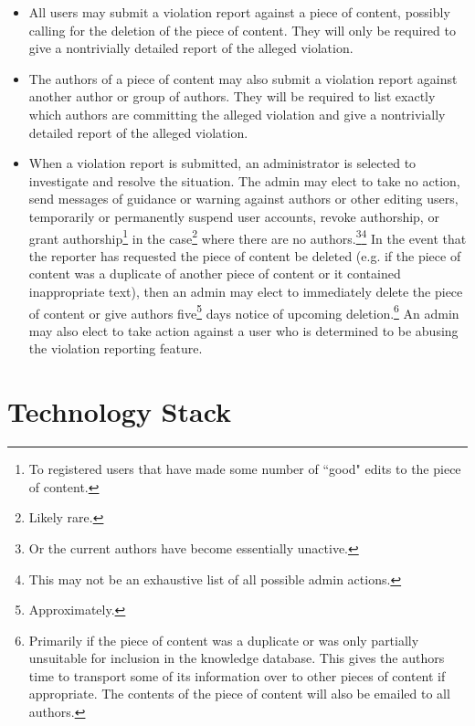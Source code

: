 \documentclass[12pt,letterpaper]{article}
\begin{document}
\begin{enumerate}
\begin{itemize}
\item All users may submit a violation report against a piece of content, possibly calling for the deletion of the piece of content. They will only be required to give a nontrivially detailed report of the alleged violation.
\item The authors of a piece of content may also submit a violation report against another author or group of authors. They will be required to list exactly which authors are committing the alleged violation and give a nontrivially detailed report of the alleged violation.
\item When a violation report is submitted, an administrator is selected to investigate and resolve the situation. The admin may elect to take no action, send messages of guidance or warning against authors or other editing users, temporarily or permanently suspend user accounts, revoke authorship, or grant authorship\footnote{To registered users that have made some number of ``good" edits to the piece of content.} in the case\footnote{Likely rare.} where there are no authors.\footnote{Or the current authors have become essentially unactive.}\footnote{This may not be an exhaustive list of all possible admin actions.} In the event that the reporter has requested the piece of content be deleted (e.g. if the piece of content was a duplicate of another piece of content or it contained inappropriate text), then an admin may elect to immediately delete the piece of content or give authors five\footnote{Approximately.} days notice of upcoming deletion.\footnote{Primarily if the piece of content was a duplicate or was only partially unsuitable for inclusion in the knowledge database. This gives the authors time to transport some of its information over to other pieces of content if appropriate. The contents of the piece of content will also be emailed to all authors.} An admin may also elect to take action against a user who is determined to be abusing the violation reporting feature.
\end{itemize}
\end{enumerate}




\section{Technology Stack}
\end{document}
